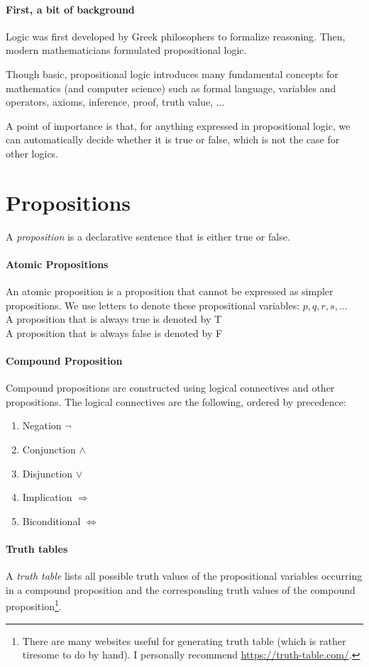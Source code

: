 \documentclass[10pt,a4paper]{book}
\begin{document}
\paragraph{First, a bit of background}
Logic was first developed by Greek philosophers to formalize reasoning. Then, modern mathematicians formulated propositional logic.\par 
Though basic, propositional logic introduces many fundamental concepts for mathematics (and computer science) such as formal language, variables and operators, axioms, inference, proof, truth value, ...\par 
A point of importance is that, for anything expressed in propositional logic, we can automatically decide whether it is true or false, which is not the case for other logics.
\section{Propositions}
A \textit{proposition} is a declarative sentence that is either true or false.
\paragraph*{Atomic Propositions}
An atomic proposition is a proposition that cannot be expressed as simpler propositions. We use letters to denote these propositional variables: $p,q,r,s,...$\\
A proposition that is always true is denoted by T\\
A proposition that is always false is denoted by F
\paragraph*{Compound Proposition}
Compound propositions are constructed using logical connectives and other propositions. The logical connectives are the following, ordered by precedence:
\begin{enumerate}
\item Negation $\neg$
\item Conjunction $\land$
\item Disjunction $\lor$
\item Implication $\Rightarrow$
\item Biconditional $\Leftrightarrow$
\end{enumerate}
\paragraph*{Truth tables}
A \textit{truth table} lists all possible truth values of the propositional variables occurring in a compound proposition and the corresponding truth values of the compound proposition\footnote{There are many websites useful for generating truth table (which is rather tiresome to do by hand). I personally recommend \url{https://truth-table.com/}.}.
\end{document}
